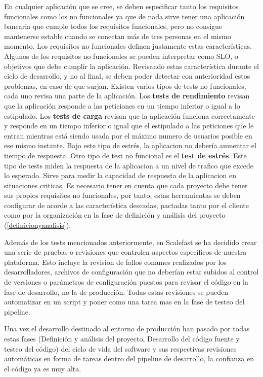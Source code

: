 \documentclass[12pt]{report} %
\begin{document}
En cualquier aplicación que se cree, se deben especificar tanto los requisitos
funcionales como los no funcionales ya que de nada sirve tener una aplicación
bancaria que cumple todos los requisitos funcionales, pero no consigue
mantenerse estable cuando se conectan más de tres personas en el mismo momento.
Los requisitos no funcionales definen justamente estas características.
Algunos de los requisitos no funcionales se pueden interpretar como
\acrfull{SLO}, o objetivos que debe cumplir la aplicación.
Revisando estas característica durante el ciclo de desarrollo, y no al final, se
deben poder detectar con anterioridad estos problemas, en caso de que surjan.
Existen varios tipos de tests no funcionales, cada uno revisa una parte de la
aplicación.
Los \textbf{tests de rendimiento} revisan que la aplicación responde a las peticiones en
un tiempo inferior o igual a lo estipulado.
Los \textbf{tests de carga} revisan que la aplicación funciona correctamente y responde en
un tiempo inferior o igual que el estipulado a las peticiones que le entran
mientras está siendo usada por el máximo numero de usuarios posible en ese mismo
instante. Bajo este tipo de estrés, la aplicacion no debería aumentar el tiempo
de respuesta.
Otro tipo de test no funcional es el \textbf{test de estrés}.
Este tipo de tests miden la respuesta de la aplicacion a un nivel de trafico que
excede lo esperado. Sirve para medir la capacidad de respuesta de la aplicacion
en situaciones criticas.
Es necesario tener en cuenta que cada proyecto debe tener sus propios requisitos no
funcionales, por tanto, estas herramientas se deben configurar de acorde a las
característica deseadas, pactadas tanto por el cliente como por la organización
en la fase de definición y análisis del proyecto (\ref{definicionyanalisis}).


Además de los tests mencionados anteriormente, en Scalefast se ha decidido crear
una serie de pruebas o revisiones que controlen aspectos específicos de nuestra
plataforma.
Esto incluye la revision de fallos comunes realizados por los desarrolladores,
archivos de configuración que no deberían estar subidos al control de versiones
o parámetros de configuración puestos para revisar el código en la fase de
desarrollo, no la de producción.
Todas estas revisiones se pueden automatizar en un script y poner como una tarea
mas en la fase de testeo del \gls{pipeline}. 

Una vez el desarrollo destinado al entorno de producción han pasado por
todas estas fases (Definición y análisis del proyecto, Desarrollo del código
fuente y testeo del código) del ciclo de vida del software y sus respectivas
revisiones automáticas en forma de tareas dentro del \gls{pipeline} de
desarrollo, la confianza en el código ya es muy alta.
\end{document}
